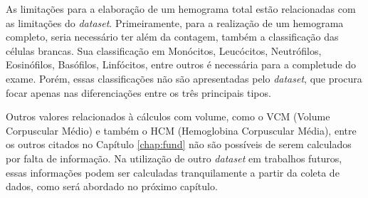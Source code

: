 As limitações para a elaboração de um hemograma total estão relacionadas com as limitações do \emph{dataset}. Primeiramente, para a realização de um hemograma completo, seria necessário ter além da contagem, também a classificação das células brancas. Sua classificação em Monócitos, Leucócitos, Neutrófilos, Eosinófilos, Basófilos, Linfócitos, entre outros é necessária para a completude do exame. Porém, essas classificações não são apresentadas pelo \emph{dataset}, que procura focar apenas nas diferenciações entre os três principais tipos.

Outros valores relacionados à cálculos com volume, como o VCM (Volume Corpuscular Médio) e também o HCM (Hemoglobina Corpuscular Média), entre os outros citados no Capítulo \ref{chap:fund} não são possíveis de serem calculados por falta de informação. Na utilização de outro \emph{dataset} em trabalhos futuros, essas informações podem ser calculadas tranquilamente a partir da coleta de dados, como será abordado no próximo capítulo. 

